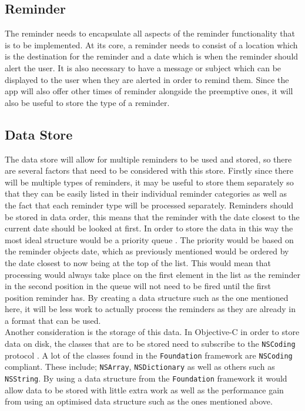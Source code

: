 \documentclass[12pt]{report}
\begin{document}
\subsection{Reminder}

The reminder needs to encapsulate all aspects of the reminder functionality that is to be implemented. At its core, a reminder needs to consist of a location which is the destination for the reminder and a date which is when the reminder should alert the user. It is also necessary to have a message or subject which can be displayed to the user when they are alerted in order to remind them. Since the app will also offer other times of reminder alongside the preemptive ones, it will also be useful to store the type of a reminder.

\subsection{Data Store}

The data store will allow for multiple reminders to be used and stored, so there are several factors that need to be considered with this store. Firstly since there will be multiple types of reminders, it may be useful to store them separately so that they can be easily listed in their individual reminder categories as well as the fact that each reminder type will be processed separately. Reminders should be stored in data order, this means that the reminder with the date closest to the current date should be looked at first. In order to store the data in this way the most ideal structure would be a priority queue \cite{priorityqueue}. The priority would be based on the reminder objects date, which as previously mentioned would be ordered by the date closest to now being at the top of the list. This would mean that processing would always take place on the first element in the list as the reminder in the second position in the queue will not need to be fired until the first position reminder has. By creating a data structure such as the one mentioned here, it will be less work to actually process the reminders as they are already in a format that can be used.\\

Another consideration is the storage of this data. In Objective-C in order to store data on disk, the classes that are to be stored need to subscribe to the \texttt{NSCoding} protocol \cite{nscoding}. A lot of the classes found in the \texttt{Foundation} framework are \texttt{NSCoding} compliant. These include; \texttt{NSArray}, \texttt{NSDictionary} as well as others such as \texttt{NSString}. By using a data structure from the \texttt{Foundation} framework it would allow data to be stored with little extra work as well as the performance gain from using an optimised data structure such as the ones mentioned above.
\end{document}
